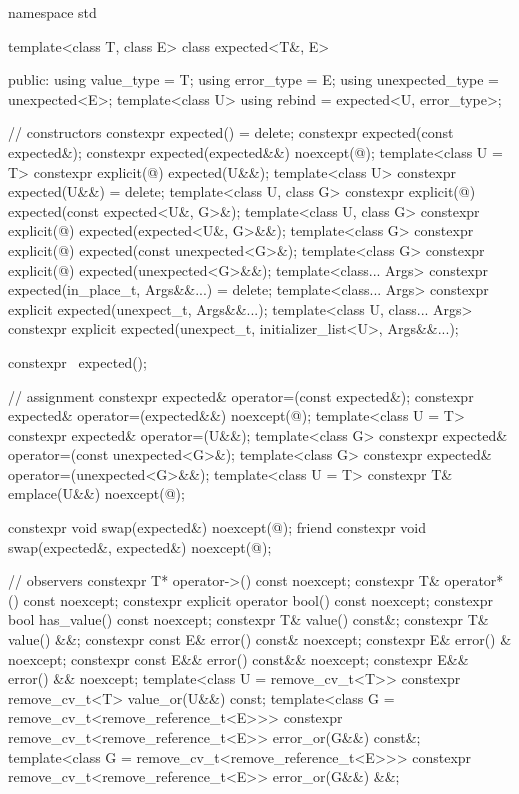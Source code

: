 \documentclass[a4paper,10pt,oneside,openany,final,article]{memoir}
\begin{document}
\begin{codeblock}
namespace std {
template<class T, class E>
class expected<T&, E> {
  public:
    using value_type      = T;
    using error_type      = E;
    using unexpected_type = unexpected<E>;
    template<class U>
    using rebind = expected<U, error_type>;

    // constructors
    constexpr expected() = delete;
    constexpr expected(const expected&);
    constexpr expected(expected&&) noexcept(@\seebelow@);
    template<class U = T>
    constexpr explicit(@\seebelow@) expected(U&&);
    template<class U>
    constexpr expected(U&&) = delete;
    template<class U, class G>
    constexpr explicit(@\seebelow@) expected(const expected<U&, G>&);
    template<class U, class G>
    constexpr explicit(@\seebelow@) expected(expected<U&, G>&&);
    template<class G>
    constexpr explicit(@\seebelow@) expected(const unexpected<G>&);
    template<class G>
    constexpr explicit(@\seebelow@) expected(unexpected<G>&&);
    template<class... Args>
    constexpr expected(in_place_t, Args&&...) = delete;
    template<class... Args>
    constexpr explicit expected(unexpect_t, Args&&...);
    template<class U, class... Args>
    constexpr explicit expected(unexpect_t, initializer_list<U>, Args&&...);

    constexpr ~expected();

    // assignment
    constexpr expected& operator=(const expected&);
    constexpr expected& operator=(expected&&) noexcept(@\seebelow@);
    template<class U = T>
    constexpr expected& operator=(U&&);
    template<class G>
    constexpr expected& operator=(const unexpected<G>&);
    template<class G>
    constexpr expected& operator=(unexpected<G>&&);
    template<class U = T>
    constexpr T& emplace(U&&) noexcept(@\seebelow@);

    constexpr void        swap(expected&) noexcept(@\seebelow@);
    friend constexpr void swap(expected&, expected&) noexcept(@\seebelow@);

    // observers
    constexpr T*        operator->() const noexcept;
    constexpr T&        operator*() const noexcept;
    constexpr explicit  operator bool() const noexcept;
    constexpr bool      has_value() const noexcept;
    constexpr T&        value() const&;
    constexpr T&        value() &&;
    constexpr const E&  error() const& noexcept;
    constexpr E&        error() & noexcept;
    constexpr const E&& error() const&& noexcept;
    constexpr E&&       error() && noexcept;
    template<class U = remove_cv_t<T>>
    constexpr remove_cv_t<T> value_or(U&&) const;
    template<class G = remove_cv_t<remove_reference_t<E>>>
    constexpr remove_cv_t<remove_reference_t<E>> error_or(G&&) const&;
    template<class G = remove_cv_t<remove_reference_t<E>>>
    constexpr remove_cv_t<remove_reference_t<E>> error_or(G&&) &&;

}}
\end{codeblock}
\end{document}
